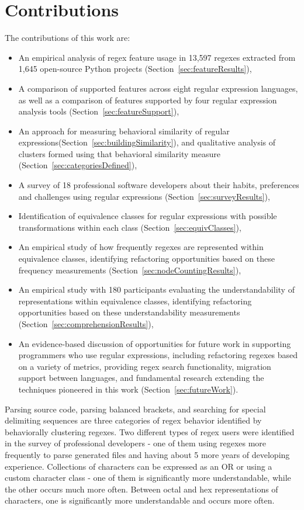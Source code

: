 \section{Contributions}

The contributions of this work are:
\begin{itemize} \setlength \itemsep{.1pt}
    \item An empirical analysis of regex feature usage in 13,597 regexes extracted from 1,645 open-source Python projects (Section~\ref{sec:featureResults}),
    \item A comparison of supported features across eight regular expression languages, as well as a comparison of features supported by four regular expression analysis tools (Section~\ref{sec:featureSupport}),
    \item An approach for measuring behavioral similarity of regular expressions(Section~\ref{sec:buildingSimilarity}), and qualitative analysis of clusters formed using that behavioral similarity measure (Section~\ref{sec:categoriesDefined}),
    \item A survey of 18 professional software developers about their habits, preferences and challenges using regular expressions (Section~\ref{sec:surveyResults}),
    \item Identification of equivalence classes for regular expressions with possible transformations within each class (Section~\ref{sec:equivClasses}),
    \item An empirical study of how frequently regexes are represented within equivalence classes, identifying refactoring opportunities based on these frequency measurements (Section~\ref{sec:nodeCountingResults}),
    \item An empirical study with 180 participants evaluating the understandability of representations within equivalence classes, identifying refactoring opportunities based on these understandability measurements (Section~\ref{sec:comprehensionResults}),
    \item An evidence-based discussion of opportunities for future work in supporting programmers who use regular expressions, including refactoring regexes based on a variety of metrics, providing regex search functionality, migration support between languages, and fundamental research extending the techniques pioneered in this work (Section~\ref{sec:futureWork}).
\end{itemize}

Parsing source code, parsing balanced brackets, and searching for special delimiting sequences are three categories of regex behavior identified by behaviorally clustering regexes.  Two different types of regex users were identified in the survey of professional developers - one of them using regexes more frequently to parse generated files and having about 5 more years of developing experience.  Collections of characters can be expressed as an OR or using a custom character class - one of them is significantly more understandable, while the other occurs much more often. Between octal and hex representations of characters, one is significantly more understandable and occurs more often.
